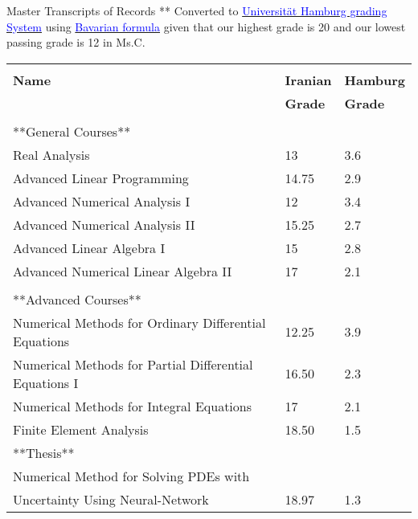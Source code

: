 \documentclass{resume} %
\begin{document}
\begin{cSection}{Master Transcripts of Records}
	** Converted to
	\href{https://apps.unive.it/common2/file/download/destinazioni_erasmus/5a9e7b1fa49c0}{\textcolor{blue}{Universit\"{a}t Hamburg grading System}} using  \href{https://www.uni-hamburg.de/en/campuscenter/bewerbung/international/studium-mit-abschluss/anerkennung-auslaendischer-schulbildung/notenumrechner.html}{\textcolor{blue}{Bavarian formula}} given that our highest grade is 20 and our lowest passing grade is 12 in Ms.C.\\
	\begin{tabular}{ @{} >{}l l l}
		&&\\
		\textbf{Name} & \textbf{Iranian} & \textbf{Hamburg}\\
		& \textbf{Grade} & \textbf{Grade}
		\\\cline{1-3}\\
	
		**General Courses** &&\\
		Real Analysis & 13 & 3.6\\
		Advanced Linear Programming & 14.75 & 2.9\\
	
		Advanced Numerical Analysis I & 12 & 3.4\\
		Advanced Numerical Analysis II & 15.25 & 2.7\\
	
		Advanced Linear Algebra I & 15 & 2.8\\
		Advanced Numerical Linear Algebra II& 17 & 2.1 \\
	
		\cline{1-3}\\
		**Advanced Courses**&&\\
	
		Numerical Methods for Ordinary Differential Equations & 12.25 & 3.9 \\
		Numerical Methods for Partial Differential Equations I & 16.50 & 2.3\\
		Numerical Methods for Integral Equations  & 17 & 2.1\\
		Finite Element Analysis & 18.50 & 1.5\\
		**Thesis**& &\\
		Numerical Method for Solving PDEs with\\ Uncertainty Using Neural-Network  &18.97& 1.3\\
	\end{tabular}


\vspace*{1cm}

\end{cSection}
\end{document}
